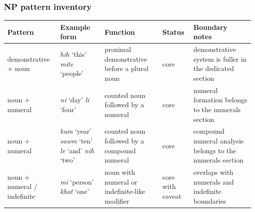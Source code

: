 \documentclass[
  11pt,
  a4paper,
]{article}
\newcounter{none} %
\newcommand{\tdim}[1]{\textit{#1}}
\newcommand{\glossquote}[1]{`#1'}
\begin{document}
\subsubsection{NP pattern inventory}\label{np-pattern-inventory}

{\def\LTcaptype{none} %
\begin{longtable}[]{@{}
  >{\raggedright\arraybackslash}p{}
  >{\raggedright\arraybackslash}p{}
  >{\raggedright\arraybackslash}p{}
  >{\raggedright\arraybackslash}p{}
  >{\raggedright\arraybackslash}p{}@{}}
\toprule\noalign{}
\begin{minipage}[b]{\linewidth}\raggedright
Pattern
\end{minipage} & \begin{minipage}[b]{\linewidth}\raggedright
Example form
\end{minipage} & \begin{minipage}[b]{\linewidth}\raggedright
Function
\end{minipage} & \begin{minipage}[b]{\linewidth}\raggedright
Status
\end{minipage} & \begin{minipage}[b]{\linewidth}\raggedright
Boundary notes
\end{minipage} \\
\midrule\noalign{}
\endhead
\bottomrule\noalign{}
\endlastfoot
demonstrative + noun & \tdim{hih} \glossquote{this} \tdim{mite}
\glossquote{people} & proximal demonstrative before a plural noun & core
& demonstrative system is fuller in the dedicated section \\
noun + numeral & \tdim{ni} \glossquote{day} \tdim{li} \glossquote{four}
& counted noun followed by a numeral & core & numeral formation belongs
to the numerals section \\
noun + numeral & \tdim{kum} \glossquote{year} \tdim{sawm}
\glossquote{ten} \tdim{le} \glossquote{and} \tdim{nih} \glossquote{two}
& counted noun followed by a compound numeral & core & compound numeral
analysis belongs to the numerals section \\
noun + numeral / indefinite & \tdim{mi} \glossquote{person} \tdim{khat}
\glossquote{one} & noun with numeral or indefinite-like modifier & core
with caveat & overlaps with numerals and indefinite boundaries \\

\end{longtable}}
\end{document}

